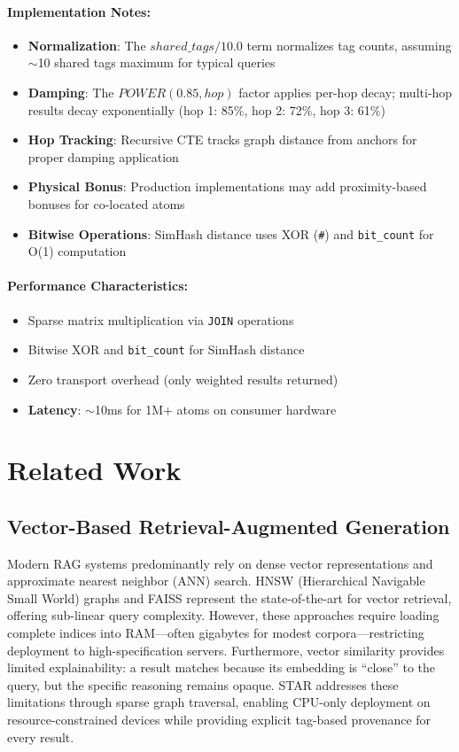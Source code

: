 \documentclass[11pt]{article}
\begin{document}
\paragraph{Implementation Notes:}
\begin{itemize}
    \item \textbf{Normalization}: The $shared\_tags / 10.0$ term normalizes tag counts, assuming $\sim$10 shared tags maximum for typical queries
    \item \textbf{Damping}: The $POWER(0.85, hop)$ factor applies per-hop decay; multi-hop results decay exponentially (hop 1: 85\%, hop 2: 72\%, hop 3: 61\%)
    \item \textbf{Hop Tracking}: Recursive CTE tracks graph distance from anchors for proper damping application
    \item \textbf{Physical Bonus}: Production implementations may add proximity-based bonuses for co-located atoms
    \item \textbf{Bitwise Operations}: SimHash distance uses XOR (\texttt{\#}) and \texttt{bit\_count} for O(1) computation
\end{itemize}

\paragraph{Performance Characteristics:}
\begin{itemize}
    \item Sparse matrix multiplication via \texttt{JOIN} operations
    \item Bitwise XOR and \texttt{bit\_count} for SimHash distance
    \item Zero transport overhead (only weighted results returned)
    \item \textbf{Latency}: $\sim$10ms for 1M+ atoms on consumer hardware
\end{itemize}

\section{Related Work}
\label{sec:related}

\subsection{Vector-Based Retrieval-Augmented Generation}

Modern RAG systems predominantly rely on dense vector representations and approximate nearest neighbor (ANN) search. HNSW (Hierarchical Navigable Small World) graphs \cite{malkov2018efficient} and FAISS \cite{johnson2019billion} represent the state-of-the-art for vector retrieval, offering sub-linear query complexity. However, these approaches require loading complete indices into RAM---often gigabytes for modest corpora---restricting deployment to high-specification servers. Furthermore, vector similarity provides limited explainability: a result matches because its embedding is ``close'' to the query, but the specific reasoning remains opaque. STAR addresses these limitations through sparse graph traversal, enabling CPU-only deployment on resource-constrained devices while providing explicit tag-based provenance for every result.
\end{document}

